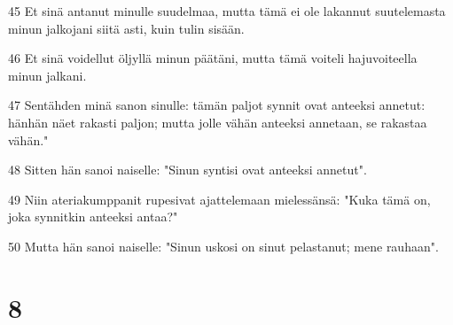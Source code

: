 \par 45 Et sinä antanut minulle suudelmaa, mutta tämä ei ole lakannut suutelemasta minun jalkojani siitä asti, kuin tulin sisään.
\par 46 Et sinä voidellut öljyllä minun päätäni, mutta tämä voiteli hajuvoiteella minun jalkani.
\par 47 Sentähden minä sanon sinulle: tämän paljot synnit ovat anteeksi annetut: hänhän näet rakasti paljon; mutta jolle vähän anteeksi annetaan, se rakastaa vähän."
\par 48 Sitten hän sanoi naiselle: "Sinun syntisi ovat anteeksi annetut".
\par 49 Niin ateriakumppanit rupesivat ajattelemaan mielessänsä: "Kuka tämä on, joka synnitkin anteeksi antaa?"
\par 50 Mutta hän sanoi naiselle: "Sinun uskosi on sinut pelastanut; mene rauhaan".

\chapter{8}


